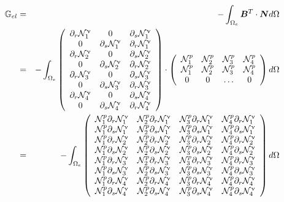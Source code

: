 \begin{eqnarray}
{\mathbb{G}}_{el} 
&=& -\int_{\Omega_e} {\bm B}^T \cdot {\bm N} d\Omega \\
&=& -\int_{\Omega_e}
\left(
\begin{array}{ccc}
\partial_r {\mathcal{N}}_1^\upnu & 0 & \partial_s {\mathcal{N}}_1^\upnu \\
0 & \partial_s {\mathcal{N}}_1^\upnu & \partial_r {\mathcal{N}}_1^\upnu \\
\partial_r {\mathcal{N}}_2^\upnu & 0 & \partial_s {\mathcal{N}}_2^\upnu \\
0 & \partial_s {\mathcal{N}}_2^\upnu & \partial_r {\mathcal{N}}_2^\upnu \\
\partial_r {\mathcal{N}}_3^\upnu & 0 & \partial_s {\mathcal{N}}_3^\upnu \\
0 & \partial_s {\mathcal{N}}_3^\upnu & \partial_r {\mathcal{N}}_3^\upnu \\
\partial_r {\mathcal{N}}_4^\upnu & 0 & \partial_s {\mathcal{N}}_4^\upnu \\
0 & \partial_s {\mathcal{N}}_4^\upnu & \partial_r {\mathcal{N}}_4^\upnu \\
\end{array}
\right)
\cdot
\left(
\begin{array}{cccc}
{\mathcal{N}}_1^p & {\mathcal{N}}_2^p & {\mathcal{N}}_3^p & {\mathcal{N}}_{4}^p \\ 
{\mathcal{N}}_1^p & {\mathcal{N}}_2^p & {\mathcal{N}}_3^p & {\mathcal{N}}_{4}^p \\ 
0 & 0 & \dots & 0
\end{array}
\right)
d\Omega \\
&=&
-\int_{\Omega_e}
\left(
\begin{array}{cccc}
{\mathcal{N}}_1^p\partial_r {\mathcal{N}}_1^\upnu & {\mathcal{N}}_2^p\partial_r {\mathcal{N}}_1^\upnu & {\mathcal{N}}_3^p\partial_r {\mathcal{N}}_1^\upnu & {\mathcal{N}}_4^p\partial_r {\mathcal{N}}_1^\upnu \\
{\mathcal{N}}_1^p\partial_s {\mathcal{N}}_1^\upnu & {\mathcal{N}}_2^p\partial_s {\mathcal{N}}_1^\upnu & {\mathcal{N}}_3^p\partial_s {\mathcal{N}}_1^\upnu & {\mathcal{N}}_4^p\partial_s {\mathcal{N}}_1^\upnu \\
{\mathcal{N}}_1^p\partial_r {\mathcal{N}}_2^\upnu & {\mathcal{N}}_2^p\partial_r {\mathcal{N}}_2^\upnu & {\mathcal{N}}_3^p\partial_r {\mathcal{N}}_2^\upnu & {\mathcal{N}}_4^p\partial_r {\mathcal{N}}_2^\upnu \\
{\mathcal{N}}_1^p\partial_s {\mathcal{N}}_2^\upnu & {\mathcal{N}}_2^p\partial_s {\mathcal{N}}_2^\upnu & {\mathcal{N}}_3^p\partial_s {\mathcal{N}}_2^\upnu & {\mathcal{N}}_4^p\partial_s {\mathcal{N}}_2^\upnu \\
{\mathcal{N}}_1^p\partial_r {\mathcal{N}}_3^\upnu & {\mathcal{N}}_2^p\partial_r {\mathcal{N}}_3^\upnu & {\mathcal{N}}_3^p\partial_r {\mathcal{N}}_3^\upnu & {\mathcal{N}}_4^p\partial_r {\mathcal{N}}_3^\upnu \\
{\mathcal{N}}_1^p\partial_s {\mathcal{N}}_3^\upnu & {\mathcal{N}}_2^p\partial_s {\mathcal{N}}_3^\upnu & {\mathcal{N}}_3^p\partial_s {\mathcal{N}}_3^\upnu & {\mathcal{N}}_4^p\partial_s {\mathcal{N}}_3^\upnu \\
{\mathcal{N}}_1^p\partial_r {\mathcal{N}}_4^\upnu & {\mathcal{N}}_2^p\partial_r {\mathcal{N}}_4^\upnu & {\mathcal{N}}_3^p\partial_r {\mathcal{N}}_4^\upnu & {\mathcal{N}}_4^p\partial_r {\mathcal{N}}_4^\upnu \\
{\mathcal{N}}_1^p\partial_s {\mathcal{N}}_4^\upnu & {\mathcal{N}}_2^p\partial_s {\mathcal{N}}_4^\upnu & {\mathcal{N}}_3^p\partial_s {\mathcal{N}}_4^\upnu & {\mathcal{N}}_4^p\partial_s {\mathcal{N}}_4^\upnu 
\end{array}
\right)
d\Omega \\
\end{eqnarray}
